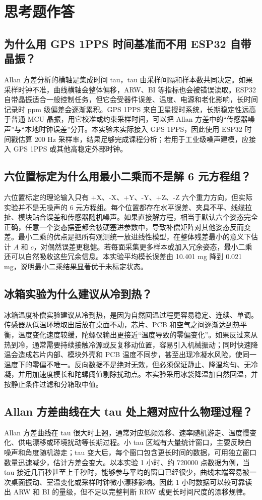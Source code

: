 \documentclass[UTF8,a4paper,12pt]{ctexart}
\begin{document}
\section{思考题作答}
\subsection{为什么用 GPS 1PPS 时间基准而不用 ESP32 自带晶振？}
Allan 方差分析的横轴是集成时间 tau，tau 由采样间隔和样本数共同决定。如果采样时钟不准，曲线横轴会整体偏移，ARW、BI 等指标也会被错误读取。ESP32 自带晶振适合一般控制任务，但它会受器件误差、温度、电源和老化影响，长时间记录时 ppm 级偏差会逐渐累积。GPS 1PPS 来自卫星授时系统，长期稳定性远高于普通 MCU 晶振，用它校准或约束采样时间，可以把 Allan 方差中的“传感器噪声”与“本地时钟误差”分开。本实验未实际接入 GPS 1PPS，因此使用 ESP32 时间戳估算 200 Hz 采样率，结果足够完成课程分析；若用于工业级噪声建模，应接入 GPS 1PPS 或其他高稳定外部时钟。

\subsection{六位置标定为什么用最小二乘而不是解 6 元方程组？}
六位置标定的理论输入只有 +X、-X、+Y、-Y、+Z、-Z 六个重力方向，但实际实验并不是无噪声的 6 元方程组。每个位置都存在水平误差、夹具不平、线缆拉扯、模块贴合误差和传感器随机噪声。如果直接解方程，相当于默认六个姿态完全正确，任意一个姿态摆歪都会被硬塞进参数中，导致补偿矩阵对其他姿态反而变差。最小二乘的优点是把所有观测统一放进线性模型，在整体残差最小的意义下估计 \(A\) 和 \(c\)，对偶然误差更稳健。若每面采集更多样本或加入冗余姿态，最小二乘还可以自然吸收这些冗余信息。本实验平均模长误差由 10.401 mg 降到 0.021 mg，说明最小二乘结果显著优于未标定状态。

\subsection{冰箱实验为什么建议从冷到热？}
冰箱温度补偿实验建议从冷到热，是因为自然回温过程更容易稳定、连续、单调。传感器从低温环境取出后放在桌面不动，芯片、PCB 和空气之间逐渐达到热平衡，温度变化速度较缓，陀螺仪输出更接近“温度导致的零偏变化”。如果反过来从热到冷，通常需要持续接触冷源或反复移动位置，容易引入机械振动；同时快速降温会造成芯片内部、模块外壳和 PCB 温度不同步，甚至出现冷凝水风险，使同一温度下的零偏不唯一。反向数据不是绝对无效，但必须保证静止、降温均匀、无冷凝，并用加速度模长和陀螺阈值剔除扰动点。本实验采用冰袋降温加自然回温，并按静止条件过滤和分箱取中值。

\subsection{Allan 方差曲线在大 tau 处上翘对应什么物理过程？}
Allan 方差曲线在 tau 很大时上翘，通常对应低频漂移、速率随机游走、温度慢变化、供电漂移或环境扰动等长期过程。小 tau 区域有大量统计窗口，主要反映白噪声和角度随机游走；tau 变大后，每个窗口包含更长时间的数据，可用独立窗口数量迅速减少，估计方差会变大。以本实验 1 小时、约 720000 点数据为例，当 tau 接近几百秒甚至上千秒时，能够参与平均的窗口已经很少，曲线末端容易被一次桌面振动、室温变化或采样时钟微小漂移影响。因此 1 小时数据可以较可靠读出 ARW 和 BI 的量级，但不足以完整判断 RRW 或更长时间尺度的漂移规律。
\end{document}
